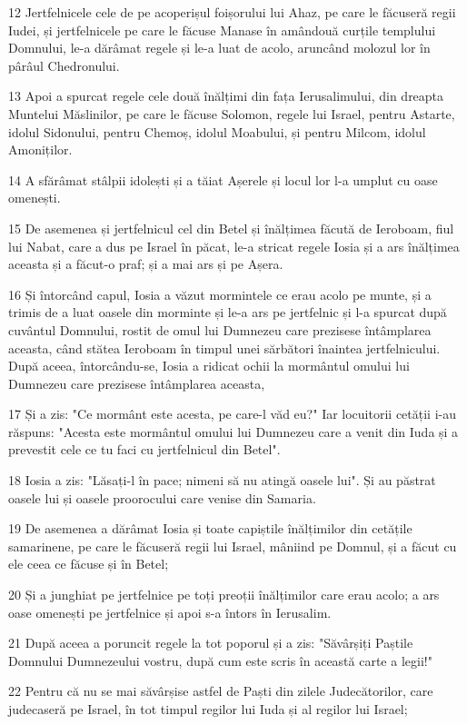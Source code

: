 \par 12 Jertfelnicele cele de pe acoperișul foișorului lui Ahaz, pe care le făcuseră regii Iudei, și jertfelnicele pe care le făcuse Manase în amândouă curțile templului Domnului, le-a dărâmat regele și le-a luat de acolo, aruncând molozul lor în pârâul Chedronului.
\par 13 Apoi a spurcat regele cele două înălțimi din fața Ierusalimului, din dreapta Muntelui Măslinilor, pe care le făcuse Solomon, regele lui Israel, pentru Astarte, idolul Sidonului, pentru Chemoș, idolul Moabului, și pentru Milcom, idolul Amoniților.
\par 14 A sfărâmat stâlpii idolești și a tăiat Așerele și locul lor l-a umplut cu oase omenești.
\par 15 De asemenea și jertfelnicul cel din Betel și înălțimea făcută de Ieroboam, fiul lui Nabat, care a dus pe Israel în păcat, le-a stricat regele Iosia și a ars înălțimea aceasta și a făcut-o praf; și a mai ars și pe Așera.
\par 16 Și întorcând capul, Iosia a văzut mormintele ce erau acolo pe munte, și a trimis de a luat oasele din morminte și le-a ars pe jertfelnic și l-a spurcat după cuvântul Domnului, rostit de omul lui Dumnezeu care prezisese întâmplarea aceasta, când stătea Ieroboam în timpul unei sărbători înaintea jertfelnicului. După aceea, întorcându-se, Iosia a ridicat ochii la mormântul omului lui Dumnezeu care prezisese întâmplarea aceasta,
\par 17 Și a zis: "Ce mormânt este acesta, pe care-l văd eu?" Iar locuitorii cetății i-au răspuns: "Acesta este mormântul omului lui Dumnezeu care a venit din Iuda și a prevestit cele ce tu faci cu jertfelnicul din Betel".
\par 18 Iosia a zis: "Lăsați-l în pace; nimeni să nu atingă oasele lui". Și au păstrat oasele lui și oasele proorocului care venise din Samaria.
\par 19 De asemenea a dărâmat Iosia și toate capiștile înălțimilor din cetățile samarinene, pe care le făcuseră regii lui Israel, mâniind pe Domnul, și a făcut cu ele ceea ce făcuse și în Betel;
\par 20 Și a junghiat pe jertfelnice pe toți preoții înălțimilor care erau acolo; a ars oase omenești pe jertfelnice și apoi s-a întors în Ierusalim.
\par 21 După aceea a poruncit regele la tot poporul și a zis: "Săvârșiți Paștile Domnului Dumnezeului vostru, după cum este scris în această carte a legii!"
\par 22 Pentru că nu se mai săvârșise astfel de Paști din zilele Judecătorilor, care judecaseră pe Israel, în tot timpul regilor lui Iuda și al regilor lui Israel;
